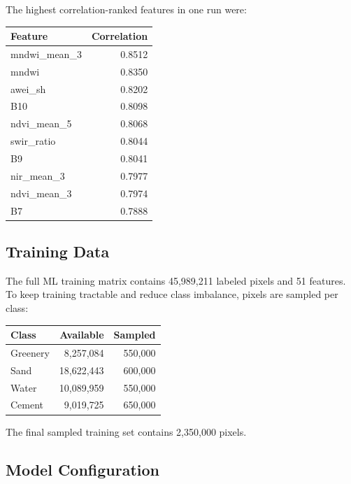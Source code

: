 \documentclass[11pt,a4paper]{article}
\begin{document}
The highest correlation-ranked features in one run were:
\begin{center}
\begin{tabular}{lr}
\toprule
Feature & Correlation \\
\midrule
mndwi\_mean\_3 & 0.8512 \\
mndwi & 0.8350 \\
awei\_sh & 0.8202 \\
B10 & 0.8098 \\
ndvi\_mean\_5 & 0.8068 \\
swir\_ratio & 0.8044 \\
B9 & 0.8041 \\
nir\_mean\_3 & 0.7977 \\
ndvi\_mean\_3 & 0.7974 \\
B7 & 0.7888 \\
\bottomrule
\end{tabular}
\end{center}

\subsection{Training Data}

The full ML training matrix contains 45,989,211 labeled pixels and 51 features. To keep training tractable and reduce class imbalance, pixels are sampled per class:
\begin{center}
\begin{tabular}{lrr}
\toprule
Class & Available & Sampled \\
\midrule
Greenery & 8,257,084 & 550,000 \\
Sand & 18,622,443 & 600,000 \\
Water & 10,089,959 & 550,000 \\
Cement & 9,019,725 & 650,000 \\
\bottomrule
\end{tabular}
\end{center}

The final sampled training set contains 2,350,000 pixels.

\subsection{Model Configuration}
\end{document}
